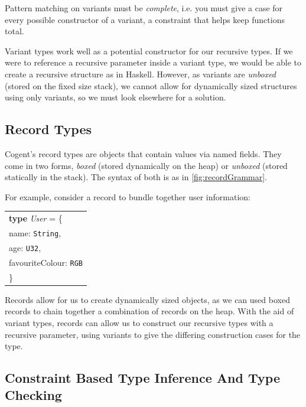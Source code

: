 Pattern matching on variants must be \textit{complete}, i.e. you must give a case for every possible constructor
of a variant, a constraint that helps keep functions total.

Variant types work well as a potential constructor for our recursive types. If we were to reference a
recursive parameter inside a variant type, we would be able to create a recursive structure as in Haskell.
However, as variants are \textit{unboxed} (stored on the fixed size stack), we cannot allow for dynamically sized structures
using only variants, so we must look elsewhere for a solution.

\subsection{Record Types}

Cogent's record types are objects that contain values via named fields. They come in two forms, \textit{boxed}
(stored dynamically on the heap) or \textit{unboxed} (stored statically in the stack). The syntax of both is
as in \autoref{fig:recordGrammar}.

For example, consider a record to bundle together user information:

\begin{center}
    \begin{tabular}{l}
    \textbf{type} \textit{User} = \{ \\
                    \hspace{1.5em} name: \texttt{String},\\
                    \hspace{1.5em} age: \texttt{U32}, \\
                    \hspace{1.5em} favouriteColour: \texttt{RGB}\\
                    \} \\
    \end{tabular}
\end{center}

Records allow for us to create dynamically sized objects, as we can used boxed records to chain together a
combination of records on the heap. With the aid of variant types, records can allow us to construct 
our recursive types with a recursive parameter, using variants to give the 
differing construction cases for the type.

\subsection{Constraint Based Type Inference And Type Checking}


